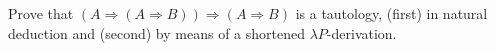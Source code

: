 \begin{problem}{5.6}
    Prove that $(A \Rightarrow (A \Rightarrow B)) \Rightarrow (A \Rightarrow B)$ is a tautology, (first) in natural deduction and (second) by means of a shortened $\lambda P$-derivation.
\end{problem}